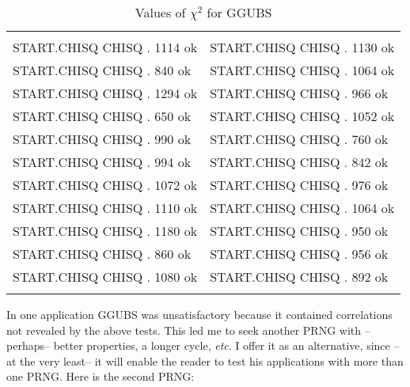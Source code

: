  
\begin{table}
    \caption{Values of $\chi^2$ for GGUBS}
    \label{tbl:03_01}
        \setlength{\tabcolsep}{20pt}
        \begin{tabular}{|ll|}
            \hline & \\
            START.CHISQ CHISQ . 1114 ok &  START.CHISQ CHISQ . 1130 ok \\ 
            START.CHISQ CHISQ . 840 ok  &  START.CHISQ CHISQ . 1064 ok \\
            START.CHISQ CHISQ . 1294 ok &  START.CHISQ CHISQ . 966 ok  \\
            START.CHISQ CHISQ . 650 ok  &  START.CHISQ CHISQ . 1052 ok \\
            START.CHISQ CHISQ . 990 ok  &  START.CHISQ CHISQ . 760 ok  \\
            START.CHISQ CHISQ . 994 ok  &  START.CHISQ CHISQ . 842 ok  \\
            START.CHISQ CHISQ . 1072 ok &  START.CHISQ CHISQ . 976 ok  \\
            START.CHISQ CHISQ . 1110 ok &  START.CHISQ CHISQ . 1064 ok \\
            START.CHISQ CHISQ . 1180 ok &  START.CHISQ CHISQ . 950 ok  \\
            START.CHISQ CHISQ . 860 ok  &  START.CHISQ CHISQ . 956 ok  \\
            START.CHISQ CHISQ . 1080 ok &  START.CHISQ CHISQ . 892 ok  \\
            & \\
            \hline
        \end{tabular} 
\end{table}

In one application GGUBS was unsatisfactory because it contained correlations
not revealed by the above tests. This led me
to seek another PRNG with --perhaps-- better properties, a
longer cycle, \textit{etc}. I offer it as an alternative, since --at the very
least-- it will enable the reader to test his applications with more
than one PRNG. Here is the second PRNG:

